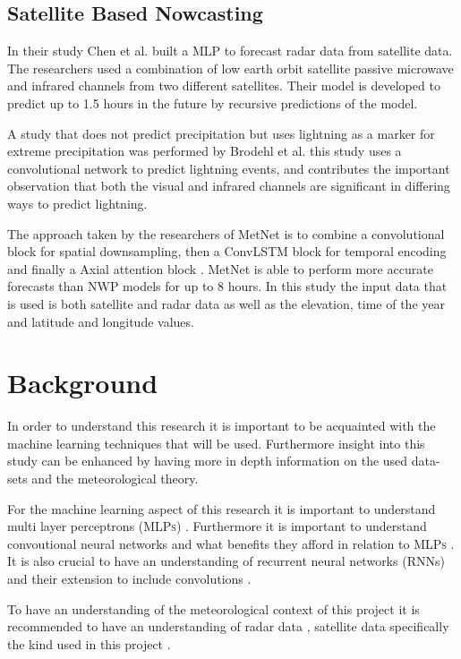 \documentclass[acmtog, authorversion]{acmart}
\begin{document}
\subsection{Satellite Based Nowcasting}

In their study Chen et al. built a \cite{precipitationEstimationFromSat} MLP to forecast radar data from satellite data. The researchers used a combination of low earth orbit satellite passive microwave and infrared channels from two different satellites. Their model is developed to predict up to 1.5 hours in the future by recursive predictions of the model.
\medskip

A study that does not predict precipitation but uses lightning as a marker for extreme precipitation was performed by Brodehl et al. \cite{predictionLightning} this study uses a convolutional network to predict lightning events, and contributes the important observation that both the visual and infrared channels are significant in differing ways to predict lightning.
\medskip

The approach taken by the researchers of MetNet \cite{sønderby2020metnet} is to combine a convolutional block for spatial downsampling, then a ConvLSTM block for temporal encoding and finally a Axial attention block \cite{vaswani2017attention}. MetNet is able to perform more accurate forecasts than NWP models for up to 8 hours. In this study the input data that is used is both satellite and radar data as well as the elevation, time of the year and latitude and longitude values.

\section{Background}
In order to understand this research it is important to be acquainted with the machine learning techniques that will be used. Furthermore insight into this study can be enhanced by having more in depth information on the used data-sets and the meteorological theory.
\medskip

For the machine learning aspect of this research it is important to understand multi layer perceptrons (\textsc{MLPs}) \cite{schmidhuber2022annotated}. Furthermore it is important to understand convoutional neural networks and what benefits they afford in relation to \textsc{MLPs} \cite{oshea2015introduction}. It is also crucial to have an understanding of recurrent neural networks (RNNs) and their extension to include convolutions \cite{convlstm}.
\medskip

To have an understanding of the meteorological context of this project it is recommended to have an understanding of radar data \cite{rinehart1991radar}, satellite data specifically the kind used in this project \cite{schmid-no-date}.
\end{document}
